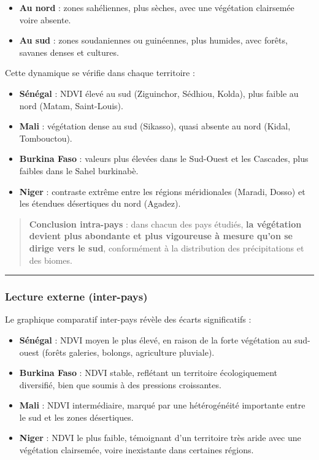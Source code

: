 \documentclass[
]{book}
\providecommand{\tightlist}{%
  \setlength{\itemsep}{0pt}\setlength{\parskip}{0pt}}
\begin{document}
\begin{itemize}
\tightlist
\item
  \textbf{Au nord} : zones sahéliennes, plus sèches, avec une végétation clairsemée voire absente.
\item
  \textbf{Au sud} : zones soudaniennes ou guinéennes, plus humides, avec forêts, savanes denses et cultures.
\end{itemize}

Cette dynamique se vérifie dans chaque territoire :

\begin{itemize}
\tightlist
\item
  \textbf{Sénégal} : NDVI élevé au sud (Ziguinchor, Sédhiou, Kolda), plus faible au nord (Matam, Saint-Louis).
\item
  \textbf{Mali} : végétation dense au sud (Sikasso), quasi absente au nord (Kidal, Tombouctou).
\item
  \textbf{Burkina Faso} : valeurs plus élevées dans le Sud-Ouest et les Cascades, plus faibles dans le Sahel burkinabè.
\item
  \textbf{Niger} : contraste extrême entre les régions méridionales (Maradi, Dosso) et les étendues désertiques du nord (Agadez).
\end{itemize}

\begin{quote}
\textbf{Conclusion intra-pays} : dans chacun des pays étudiés, \textbf{la végétation devient plus abondante et plus vigoureuse à mesure qu'on se dirige vers le sud}, conformément à la distribution des précipitations et des biomes.
\end{quote}

\begin{center}\rule{0.5\linewidth}{0.5pt}\end{center}

\subsubsection{Lecture externe (inter-pays)}\label{lecture-externe-inter-pays}

Le graphique comparatif inter-pays révèle des écarts significatifs :

\begin{itemize}
\tightlist
\item
  \textbf{Sénégal} : NDVI moyen le plus élevé, en raison de la forte végétation au sud-ouest (forêts galeries, bolongs, agriculture pluviale).
\item
  \textbf{Burkina Faso} : NDVI stable, reflétant un territoire écologiquement diversifié, bien que soumis à des pressions croissantes.
\item
  \textbf{Mali} : NDVI intermédiaire, marqué par une hétérogénéité importante entre le sud et les zones désertiques.
\item
  \textbf{Niger} : NDVI le plus faible, témoignant d'un territoire très aride avec une végétation clairsemée, voire inexistante dans certaines régions.
\end{itemize}
\end{document}
